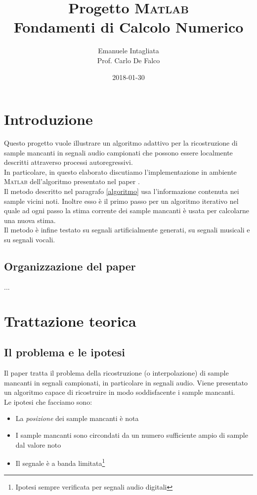 \documentclass{article}
\title{Progetto \textsc{Matlab}\\Fondamenti di Calcolo Numerico}
\date{2018-01-30}
\author{Emanuele Intagliata\\Prof. Carlo De Falco}
\begin{document}
	\maketitle

	\newpage
	
	\tableofcontents

	\newpage
	\section{Introduzione}
Questo progetto vuole illustrare un algoritmo adattivo per la ricostruzione di sample mancanti in segnali audio campionati che possono essere localmente descritti attraverso processi autoregressivi.
\\
In particolare, in questo elaborato discutiamo l'implementazione in ambiente \textsc{Matlab} dell'algoritmo presentato nel paper \cite{paper_1986}.
\medskip
\\
Il metodo descritto nel paragrafo \ref{algoritmo} usa l'informazione contenuta nei sample vicini noti. Inoltre esso è il primo passo per un algoritmo iterativo nel quale ad ogni passo la stima corrente dei sample mancanti è usata per calcolarne una nuova stima. 
\\
Il metodo è infine testato su segnali artificialmente generati, su segnali musicali e su segnali vocali.

	\subsection{Organizzazione del paper}
	
	...

\newpage
	\section{Trattazione teorica}
	
	\subsection{Il problema e le ipotesi}
Il paper \cite{paper_1986} tratta il problema della ricostruzione (o interpolazione) di sample mancanti in segnali campionati, in particolare in segnali audio. Viene presentato un algoritmo capace di ricostruire in modo soddisfacente i sample mancanti.
\\
Le ipotesi che facciamo sono:

\begin{itemize}
\item La \emph{posizione} dei sample mancanti è nota
\item I sample mancanti sono circondati da un numero sufficiente ampio di sample dal valore noto
\item Il segnale è a banda limitata\footnote{Ipotesi sempre verificata per segnali audio digitali}
\end{itemize}
\end{document}
